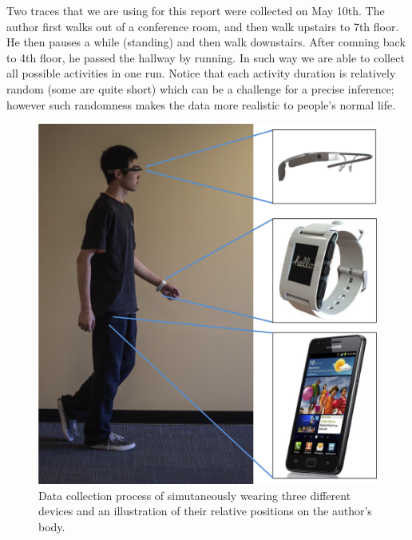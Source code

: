 Two traces that we are using for this report were collected on May 10th. The author first walks out of a conference room, and then walk upstairs to 7th floor. He then pauses a while (standing) and then walk downstairs. After comning back to 4th floor, he passed the hallway by running. In such way we are able to collect all possible activities in one run. Notice that each activity duration is relatively random (some are quite short) which can be a challenge for a precise inference; however such randomness makes the data more realistic to people's normal life. 

\begin{figure}
  \centering
  \includegraphics[width=0.9\columnwidth]{figures/experiement_setup.png}
  \caption{Data collection process of simutaneously wearing three different devices and an illustration of their relative positions on the author's body.}
  \label{fig:exp}
\end{figure}



